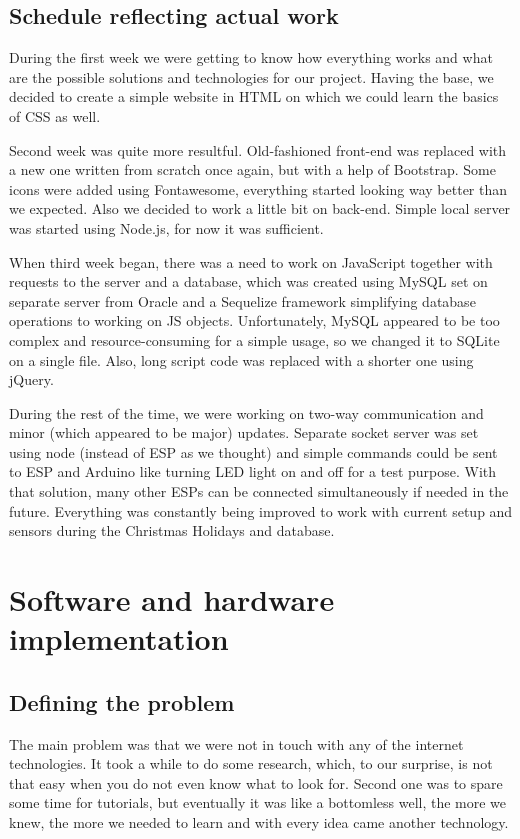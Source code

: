 \documentclass[oneside,a4paper,11pt]{report}
\begin{document}
\section{Schedule reflecting actual work}
\hspace{1cm}During the first week we were getting to know how everything works and what are the possible solutions and technologies for our project. Having the base, we decided to create a simple website in HTML on which we could learn the basics of CSS as well. \par
\hspace{0.5cm}Second week was quite more resultful. Old-fashioned front-end was replaced with a new one written from scratch once again, but with a help of Bootstrap. Some icons were added using Fontawesome, everything started looking way better than we expected. Also we decided to work a little bit on back-end. Simple local server was started using Node.js, for now it was sufficient.\par
\hspace{0.5cm}When third week began, there was a need to work on JavaScript together with requests to the server and a database, which was created using MySQL set on separate server from Oracle and a Sequelize framework simplifying database operations to working on JS objects. Unfortunately, MySQL appeared to be too complex and resource-consuming for a simple usage, so we changed it to SQLite on a single file. Also, long script code was replaced with a shorter one using jQuery.\par
\hspace{0.5cm}During the rest of the time, we were working on two-way communication and minor (which appeared to be major) updates. Separate socket server was set using node (instead of ESP as we thought) and simple commands could be sent to ESP and Arduino like turning LED light on and off for a test purpose. With that solution, many other ESPs can be connected simultaneously if needed in the future. Everything was constantly being improved to work with current setup and sensors during the Christmas Holidays and database. 


\chapter{Software and hardware implementation}
\section{Defining the problem}
\hspace{1cm}The main problem was that we were not in touch with any of the internet technologies. It took a while to do some research, which, to our surprise, is not that easy when you do not even know what to look for. Second one was to spare some time for tutorials, but eventually it was like a bottomless well, the more we knew, the more we needed to learn and with every idea came another technology.
\end{document}
